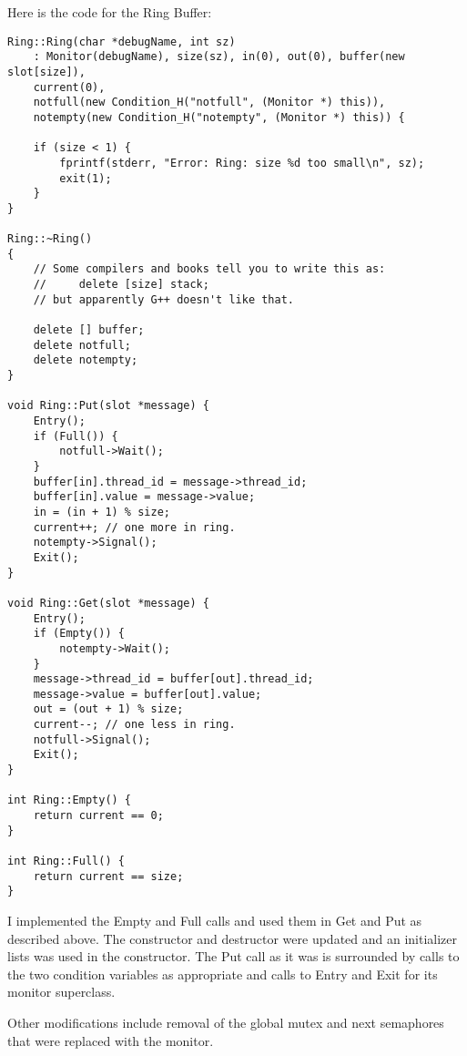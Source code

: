 \documentclass[11pt]{article}
\begin{document}
\begin{question}
    Here is the code for the Ring Buffer:
    \begin{verbatim}
Ring::Ring(char *debugName, int sz)
    : Monitor(debugName), size(sz), in(0), out(0), buffer(new slot[size]),
    current(0),
    notfull(new Condition_H("notfull", (Monitor *) this)),
    notempty(new Condition_H("notempty", (Monitor *) this)) {

    if (size < 1) {
        fprintf(stderr, "Error: Ring: size %d too small\n", sz);
        exit(1);
    }
}

Ring::~Ring()
{
    // Some compilers and books tell you to write this as:
    //     delete [size] stack;
    // but apparently G++ doesn't like that.

    delete [] buffer;
    delete notfull;
    delete notempty;
}

void Ring::Put(slot *message) {
    Entry();
    if (Full()) {
        notfull->Wait();
    }
    buffer[in].thread_id = message->thread_id;
    buffer[in].value = message->value;
    in = (in + 1) % size;
    current++; // one more in ring.
    notempty->Signal();
    Exit();
}

void Ring::Get(slot *message) {
    Entry();
    if (Empty()) {
        notempty->Wait();
    }
    message->thread_id = buffer[out].thread_id;
    message->value = buffer[out].value;
    out = (out + 1) % size;
    current--; // one less in ring.
    notfull->Signal();
    Exit();
}

int Ring::Empty() {
    return current == 0;
}

int Ring::Full() {
    return current == size;
}
    \end{verbatim}

    I implemented the Empty and Full calls and used them in Get and Put as described above. The constructor and destructor were updated and an initializer lists was used in the constructor. The Put call as it was is surrounded by calls to the two condition variables as appropriate and calls to Entry and Exit for its monitor superclass.

    Other modifications include removal of the global mutex and next semaphores that were replaced with the monitor.

\end{question}
\end{document}

